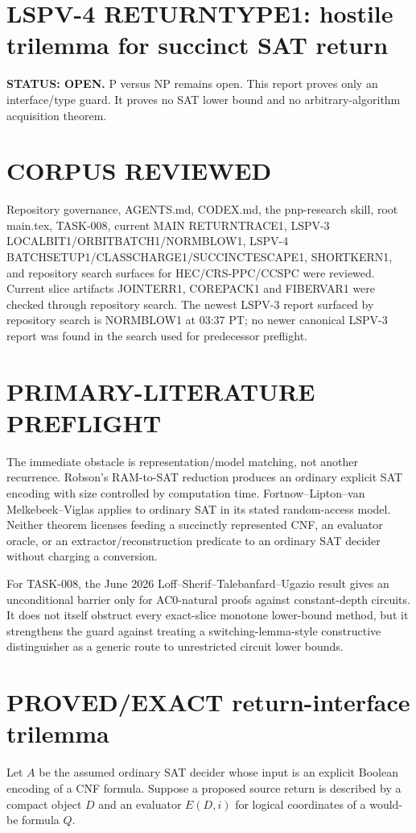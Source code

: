 \documentclass[11pt]{article}
\begin{document}
\section*{LSPV-4 RETURNTYPE1: hostile trilemma for succinct SAT return}
\textbf{STATUS: OPEN.} P versus NP remains open. This report proves only an interface/type guard. It proves no SAT lower bound and no arbitrary-algorithm acquisition theorem.

\section*{CORPUS REVIEWED}
Repository governance, AGENTS.md, CODEX.md, the pnp-research skill, root main.tex, TASK-008, current MAIN RETURNTRACE1, LSPV-3 LOCALBIT1/ORBITBATCH1/NORMBLOW1, LSPV-4 BATCHSETUP1/CLASSCHARGE1/SUCCINCTESCAPE1, SHORTKERN1, and repository search surfaces for HEC/CRS-PPC/CCSPC were reviewed. Current slice artifacts JOINTERR1, COREPACK1 and FIBERVAR1 were checked through repository search. The newest LSPV-3 report surfaced by repository search is NORMBLOW1 at 03:37 PT; no newer canonical LSPV-3 report was found in the search used for predecessor preflight.

\section*{PRIMARY-LITERATURE PREFLIGHT}
The immediate obstacle is representation/model matching, not another recurrence. Robson's RAM-to-SAT reduction produces an ordinary explicit SAT encoding with size controlled by computation time. Fortnow--Lipton--van Melkebeek--Viglas applies to ordinary SAT in its stated random-access model. Neither theorem licenses feeding a succinctly represented CNF, an evaluator oracle, or an extractor/reconstruction predicate to an ordinary SAT decider without charging a conversion.

For TASK-008, the June 2026 Loff--Sherif--Talebanfard--Ugazio result gives an unconditional barrier only for AC0-natural proofs against constant-depth circuits. It does not itself obstruct every exact-slice monotone lower-bound method, but it strengthens the guard against treating a switching-lemma-style constructive distinguisher as a generic route to unrestricted circuit lower bounds.

\section*{PROVED/EXACT return-interface trilemma}
Let $A$ be the assumed ordinary SAT decider whose input is an explicit Boolean encoding of a CNF formula. Suppose a proposed source return is described by a compact object $D$ and an evaluator $E(D,i)$ for logical coordinates of a would-be formula $Q$.
\end{document}
